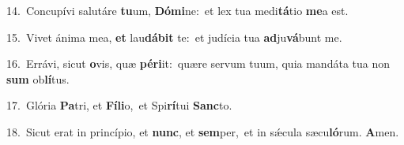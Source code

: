 {\numbfont\textcolor{\numbcolor}{14.}}~Concupívi salutáre \textbf{tu}\-um, \textbf{Dó}\-\textbf{mi}ne:~\star et lex tua medi\-\textbf{tá}\-tio \textbf{me}\-a est.\par
{\numbfont\textcolor{\numbcolor}{15.}}~Vivet ánima mea, \textbf{et} lau\-\textbf{dá}\-\textbf{bit} te:~\star et judícia tua \textbf{ad}\-ju\-\textbf{vá}\-bunt me.\par
{\numbfont\textcolor{\numbcolor}{16.}}~Errávi, sicut \textbf{o}\-vis, quæ \textbf{pér}\-\textbf{i}it:~\star quære servum tuum, quia mandáta tua non \textbf{sum} ob\-\textbf{lí}\-tus.\par
{\numbfont\textcolor{\numbcolor}{17.}}~Glória \textbf{Pa}\-tri, et \textbf{Fí}\-\textbf{li}o,~\star et Spi\-\textbf{rí}\-tui \textbf{Sanc}\-to.\par
{\numbfont\textcolor{\numbcolor}{18.}}~Sicut erat in princípio, et \textbf{nunc}\-, et \textbf{sem}\-per,~\star et in sǽcula sæcu\-\textbf{ló}\-rum. \textbf{A}\-men.\par
